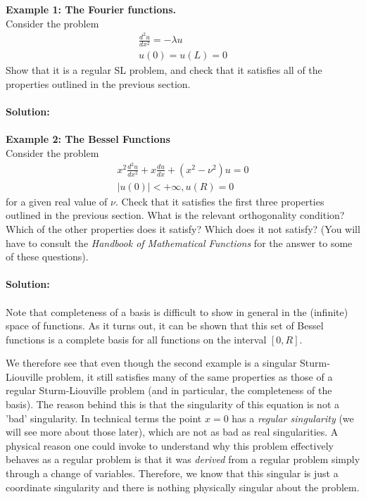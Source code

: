 {\bf Example 1: The Fourier functions.} \\  Consider the problem 
\begin{eqnarray}
\frac{d^2 u}{dx^2}=  -\lambda u   \nonumber \\
u(0) = u(L) = 0 
\end{eqnarray}
Show that it is a regular SL problem, and check that it satisfies all of the properties outlined in the previous section. 
\\
\\
{{\color{red} {\bf Solution:}}
}
\\
\\
{\bf Example 2: The Bessel Functions}\\
Consider the problem
\begin{eqnarray}
    x^2 \frac{d^2 u}{dx^2} + x \frac{du}{dx} + (x^2 - \nu^2) u = 0 \nonumber \\ 
    |u(0)| < + \infty, u(R) = 0
\end{eqnarray}
for a given real value of $\nu$. 
Check that
it satisfies the first three properties outlined in the previous section. What is the relevant orthogonality condition? Which of the other properties does it satisfy? Which does it not satisfy? (You will have to consult the {\it Handbook of Mathematical Functions} for the answer to some of these questions). 
\\
\\
{{\color{red} {\bf Solution:}}
}
\\
\\
Note that completeness of a basis is difficult to show in general in the (infinite) space of functions. As it turns out, it can be shown that this set of Bessel functions is a complete basis for all functions on the interval $[0,R]$. 

We therefore see that even though the second example is a singular Sturm-Liouville problem, it still satisfies many of the same properties as those of a regular Sturm-Liouville problem (and in particular, the completeness of the basis). The reason behind this is that the singularity of this equation is not a 'bad' singularity.  In technical terms the point $x=0$ has a {\it regular singularity} (we will see more about those later), which are not as bad as real singularities. A physical reason one could invoke to understand why this problem effectively behaves as a regular problem is that it was {\it derived} from a regular problem simply through a change of variables. Therefore, 
we know that this singular is just a coordinate singularity and there is nothing physically singular about the problem. 
